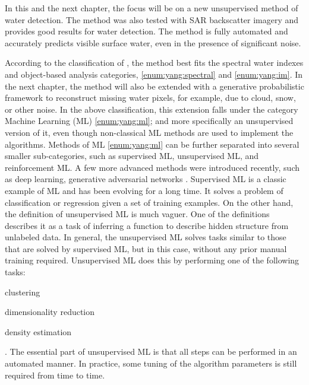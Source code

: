 In this and the next chapter, the focus will be on a new unsupervised method of water detection. The method was also tested with \gls{SAR} backscatter imagery and provides good results for water detection. The method is fully automated and accurately predicts visible surface water, even in the presence of significant noise.

According to the classification of \citet{yang2015landsat}, the method best fits the spectral water indexes and object-based analysis categories, \ref{enum:yang:spectral} and \ref{enum:yang:im}. In the next chapter, the method will also be extended with a generative probabilistic framework to reconstruct missing water pixels, for example, due to cloud, snow, or other noise. In the above classification, this extension falls under the category Machine Learning (ML) \ref{enum:yang:ml}; and more specifically an unsupervised version of it, even though non-classical ML methods are used to implement the algorithms. Methods of ML \ref{enum:yang:ml} can be further separated into several smaller sub-categories, such as supervised ML, unsupervised ML, and reinforcement ML. A few more advanced methods were introduced recently, such as deep learning, generative adversarial networks \citet{goodfellow2014generative}. Supervised ML is a classic example of ML and has been evolving for a long time. It solves a problem of classification or regression given a set of training examples. On the other hand, the definition of unsupervised ML is much vaguer. One of the definitions describes it as a task of inferring a function to describe hidden structure from unlabeled data. In general, the unsupervised ML solves tasks similar to those that are solved by supervised ML, but in this case, without any prior manual training required. Unsupervised ML does this by performing one of the following tasks: 
\begin{enumerate*}[label=(\emph{\arabic*})]
	\item \label {enum:ml2:clustering} clustering
	\item \label {enum:ml2:dimentionality-reduction} dimensionality reduction
	\item \label {enum:ml2:density} density estimation
\end{enumerate*}.
The essential part of unsupervised ML is that all steps can be performed in an automated manner. In practice, some tuning of the algorithm parameters is still required from time to time.

